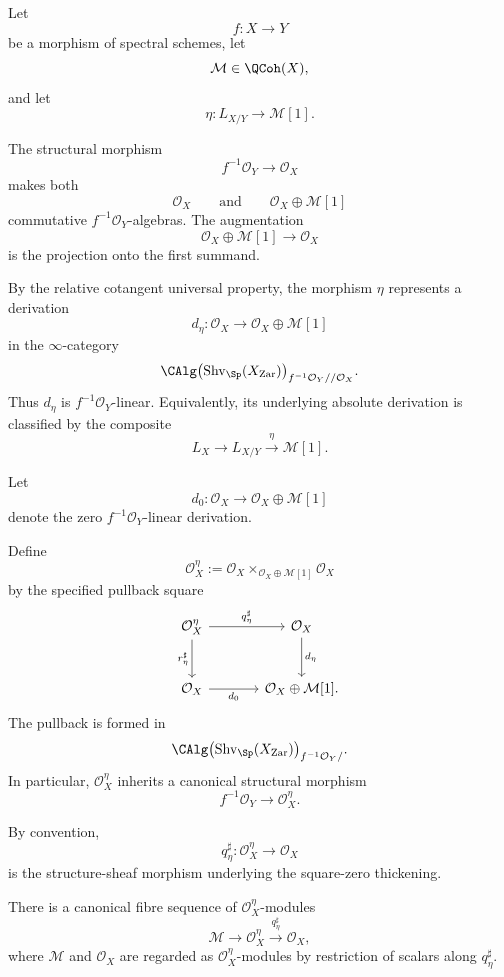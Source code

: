 \begin{construction}
\label{con:global-square-zero-extension}
Let
\[
    f
    \colon
    X
    \longrightarrow
    Y
\]
be a morphism of spectral schemes, let
\[
    \mathcal M
    \in
    \QCoh(X),
\]
and let
\[
    \eta
    \colon
    L_{X/Y}
    \longrightarrow
    \mathcal M[1].
\]

The structural morphism
\[
    f^{-1}\mathcal O_Y
    \longrightarrow
    \mathcal O_X
\]
makes both
\[
    \mathcal O_X
    \qquad\text{and}\qquad
    \mathcal O_X\oplus\mathcal M[1]
\]
commutative \(f^{-1}\mathcal O_Y\)-algebras. The augmentation
\[
    \mathcal O_X\oplus\mathcal M[1]
    \longrightarrow
    \mathcal O_X
\]
is the projection onto the first summand.

By the relative cotangent universal property, the morphism \(\eta\)
represents a derivation
\[
    d_\eta
    \colon
    \mathcal O_X
    \longrightarrow
    \mathcal O_X\oplus\mathcal M[1]
\]
in the \(\infty\)-category
\[
    \CAlg
    \bigl(
        \operatorname{Shv}_{\Sp}(X_{\mathrm{Zar}})
    \bigr)_{f^{-1}\mathcal O_Y//\mathcal O_X}.
\]
Thus \(d_\eta\) is \(f^{-1}\mathcal O_Y\)-linear. Equivalently, its
underlying absolute derivation is classified by the composite
\[
    L_X
    \longrightarrow
    L_{X/Y}
    \xrightarrow{\eta}
    \mathcal M[1].
\]

Let
\[
    d_0
    \colon
    \mathcal O_X
    \longrightarrow
    \mathcal O_X\oplus\mathcal M[1]
\]
denote the zero \(f^{-1}\mathcal O_Y\)-linear derivation.

Define
\[
    \mathcal O_X^\eta
    :=
    \mathcal O_X
    \times_{\mathcal O_X\oplus\mathcal M[1]}
    \mathcal O_X
\]
by the specified pullback square
\[
\begin{tikzcd}[column sep=large, row sep=large]
    \mathcal O_X^\eta
        \arrow[r, "q_\eta^\sharp"]
        \arrow[d, "r_\eta^\sharp"']
    &
    \mathcal O_X
        \arrow[d, "d_\eta"]
    \\
    \mathcal O_X
        \arrow[r, "d_0"']
    &
    \mathcal O_X\oplus\mathcal M[1].
\end{tikzcd}
\]
The pullback is formed in
\[
    \CAlg
    \bigl(
        \operatorname{Shv}_{\Sp}(X_{\mathrm{Zar}})
    \bigr)_{f^{-1}\mathcal O_Y/}.
\]
In particular, \(\mathcal O_X^\eta\) inherits a canonical structural
morphism
\[
    f^{-1}\mathcal O_Y
    \longrightarrow
    \mathcal O_X^\eta.
\]

By convention,
\[
    q_\eta^\sharp
    \colon
    \mathcal O_X^\eta
    \longrightarrow
    \mathcal O_X
\]
is the structure-sheaf morphism underlying the square-zero thickening.

There is a canonical fibre sequence of
\(\mathcal O_X^\eta\)-modules
\[
    \mathcal M
    \longrightarrow
    \mathcal O_X^\eta
    \xrightarrow{q_\eta^\sharp}
    \mathcal O_X,
\]
where \(\mathcal M\) and \(\mathcal O_X\) are regarded as
\(\mathcal O_X^\eta\)-modules by restriction of scalars along
\(q_\eta^\sharp\).
\end{construction}

